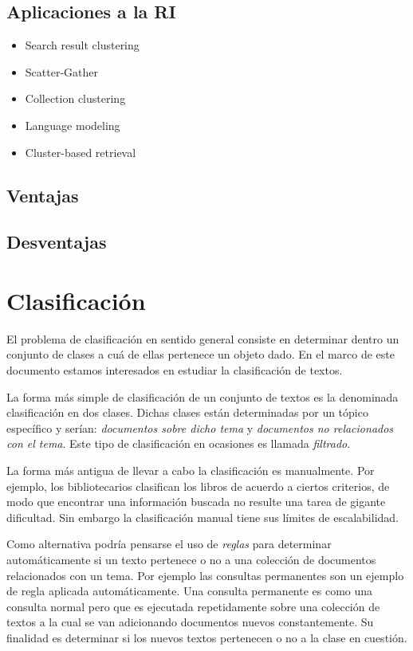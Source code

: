 \documentclass{llncs}
\begin{document}
\subsection{Aplicaciones a la RI} 
\begin{itemize}
	\item Search result clustering
	
	\item Scatter-Gather
	
	\item Collection clustering
	
	\item Language modeling
	
	\item Cluster-based retrieval
\end{itemize}

\subsection{Ventajas} 

\subsection{Desventajas} 

\section{Clasificaci\'on}

	El problema de clasificaci\'on en sentido general consiste en determinar dentro un conjunto de clases a cu\'a de ellas pertenece un objeto dado. En el marco de este documento estamos interesados en estudiar la clasificaci\'on de textos. 
	
	La forma m\'as simple de clasificaci\'on de un conjunto de textos es la denominada clasificaci\'on en dos clases. Dichas clases est\'an determinadas por un t\'opico espec\'ifico y ser\'ian: \emph{documentos sobre dicho tema } y \emph{documentos no relacionados con el tema}. Este tipo de clasificaci\'on en ocasiones es llamada \emph{filtrado}. 
	
	La forma m\'as antigua de llevar a cabo la clasificaci\'on es manualmente. Por ejemplo, los bibliotecarios clasifican los libros de acuerdo a ciertos criterios, de modo que encontrar una informaci\'on buscada no resulte una tarea de gigante dificultad. Sin embargo la clasificaci\'on manual tiene sus l\'imites de escalabilidad. 
	
	Como alternativa podr\'ia pensarse el uso de \emph{reglas} para determinar autom\'aticamente si un texto pertenece o no a una colecci\'on de documentos relacionados con un tema. Por ejemplo las consultas permanentes son un ejemplo de regla aplicada autom\'aticamente. Una consulta permanente es como una consulta normal pero que es ejecutada repetidamente sobre una colecci\'on de textos a la cual se van adicionando documentos nuevos constantemente. Su finalidad es determinar si los nuevos textos pertenecen o no a la clase en cuesti\'on.
	
\end{document}
